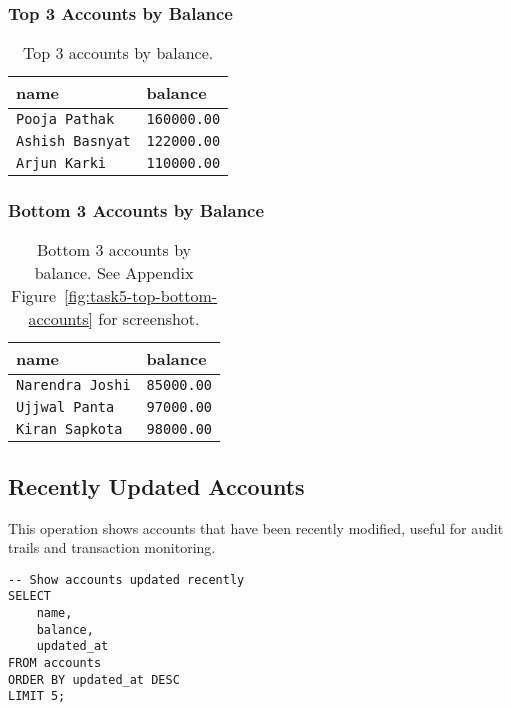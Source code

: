 \subsubsection{Top 3 Accounts by Balance}
\begin{table}[H]
  \centering
  \begin{tabular}{|l|l|}
    \hline
    \textbf{name} & \textbf{balance} \\
    \hline
    \texttt{Pooja Pathak} & \texttt{160000.00} \\
    \texttt{Ashish Basnyat} & \texttt{122000.00} \\
    \texttt{Arjun Karki} & \texttt{110000.00} \\
    \hline
  \end{tabular}
  \caption{Top 3 accounts by balance.}
\end{table}

\subsubsection{Bottom 3 Accounts by Balance}
\begin{table}[H]
  \centering
  \begin{tabular}{|l|l|}
    \hline
    \textbf{name} & \textbf{balance} \\
    \hline
    \texttt{Narendra Joshi} & \texttt{85000.00} \\
    \texttt{Ujjwal Panta} & \texttt{97000.00} \\
    \texttt{Kiran Sapkota} & \texttt{98000.00} \\
    \hline
  \end{tabular}
  \caption{Bottom 3 accounts by balance. See Appendix Figure~\ref{fig:task5-top-bottom-accounts} for screenshot.}
\end{table}

\subsection{Recently Updated Accounts}
This operation shows accounts that have been recently modified, useful for audit trails and transaction monitoring.

\begin{verbatim}
-- Show accounts updated recently
SELECT
    name,
    balance,
    updated_at
FROM accounts
ORDER BY updated_at DESC
LIMIT 5;
\end{verbatim}

